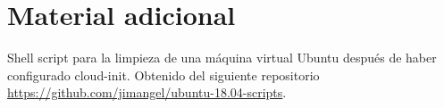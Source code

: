 \chapter{Material adicional}
\label{chap:adicional}

Shell script para la limpieza de una máquina virtual Ubuntu después de haber configurado cloud-init. Obtenido del siguiente repositorio \url{https://github.com/jimangel/ubuntu-18.04-scripts}.

